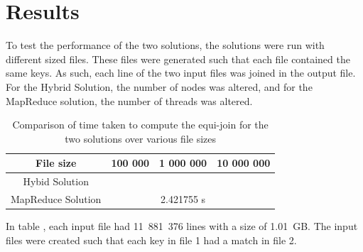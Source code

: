 \documentclass[10pt,twocolumn]{witseiepaper}
\begin{document}
%
%

\section{Results}
To test the performance of the two solutions, the solutions were run with different sized files. These files were generated such that each file contained the same keys. As such, each line of the two input files was joined in the output file. For the Hybrid Solution, the number of nodes was altered, and for the MapReduce solution, the number of threads was altered.


\begin{table} [h]
	\centering
	\caption{Comparison of time taken to compute the equi-join for the two solutions over various file sizes}
	\label{tab:results}

\begin{tabular}{|c|c|c|c|}
	\hline 
	File size & 100 000 & 1 000 000 & 10 000 000 \\ 
	\hline
	\hline 
	Hybid Solution &  &  &  \\ 
	\hline 
	MapReduce Solution &  & 2.421755 s &  \\ 
	\hline 
\end{tabular} 
\end{table}

In table , each input file had 11~881~376 lines with a size of 1.01~GB. The input files were created such that each key in file 1 had a match in file 2.
\end{document}
